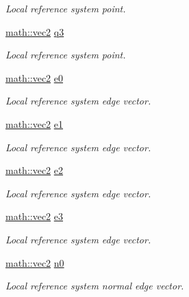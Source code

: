 \begin{DoxyCompactItemize}
\begin{DoxyCompactList}\small\item\em Local reference system point. \end{DoxyCompactList}\item 
\hyperlink{structphysim_1_1math_1_1vec2}{math\+::vec2} \hyperlink{classphysim_1_1geometric_1_1rectangle_abfe5d5c4a309bdd1ab65898c757334e6}{q3}
\begin{DoxyCompactList}\small\item\em Local reference system point. \end{DoxyCompactList}\item 
\hyperlink{structphysim_1_1math_1_1vec2}{math\+::vec2} \hyperlink{classphysim_1_1geometric_1_1rectangle_a70d4839212717247ae294f94cd7de372}{e0}
\begin{DoxyCompactList}\small\item\em Local reference system edge vector. \end{DoxyCompactList}\item 
\hyperlink{structphysim_1_1math_1_1vec2}{math\+::vec2} \hyperlink{classphysim_1_1geometric_1_1rectangle_a511c131352fa83a64f3f30935ae87be7}{e1}
\begin{DoxyCompactList}\small\item\em Local reference system edge vector. \end{DoxyCompactList}\item 
\hyperlink{structphysim_1_1math_1_1vec2}{math\+::vec2} \hyperlink{classphysim_1_1geometric_1_1rectangle_a7d4880bb512b054f354393df0309c2b8}{e2}
\begin{DoxyCompactList}\small\item\em Local reference system edge vector. \end{DoxyCompactList}\item 
\hyperlink{structphysim_1_1math_1_1vec2}{math\+::vec2} \hyperlink{classphysim_1_1geometric_1_1rectangle_a94e615cbf893ff4950e845545796c779}{e3}
\begin{DoxyCompactList}\small\item\em Local reference system edge vector. \end{DoxyCompactList}\item 
\hyperlink{structphysim_1_1math_1_1vec2}{math\+::vec2} \hyperlink{classphysim_1_1geometric_1_1rectangle_a1515a4ffb5dd7bcd8ddc0fbda9eb6564}{n0}
\begin{DoxyCompactList}\small\item\em Local reference system normal edge vector. \end{DoxyCompactList}\item 

\end{DoxyCompactItemize}
